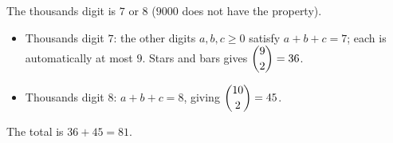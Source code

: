 The thousands digit is $7$ or $8$ ($9000$ does not have the property).
\begin{itemize}
\item Thousands digit $7$: the other digits $a,b,c\ge0$ satisfy $a+b+c=7$; each is automatically at most $9$. Stars and bars gives $\dbinom{9}{2}=36$.
\item Thousands digit $8$: $a+b+c=8$, giving $\dbinom{10}{2}=45$.
\end{itemize}
The total is $36+45=\boxed{81}$.
